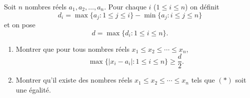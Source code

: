 Soit $n$ nombres réels $a_1, a_2, \ldots, a_n$. Pour chaque $i$ ($1 \leq i \leq n$) on définit
\[
d_i = \max\{a_j : 1 \leq j \leq i\} - \min\{a_j : i \leq j \leq n\}
\]
et on pose
\[
d = \max\{d_i : 1 \leq i \leq n\}.
\]
\begin{enumerate}
  \item[(a)] Montrer que pour tous nombres réels $x_1 \leq x_2 \leq \cdots \leq x_n$,
  \[
  \max\{|x_i - a_i| : 1 \leq i \leq n\} \geq \frac{d}{2}. \tag{$*$}
  \]
  \item[(b)] Montrer qu'il existe des nombres réels $x_1 \leq x_2 \leq \cdots \leq x_n$ tels que $(*)$ soit
  une égalité.
\end{enumerate}
